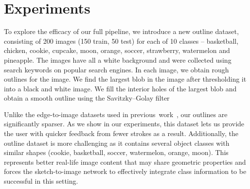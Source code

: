 
\section{Experiments}
\label{sec:experiments}
To explore the efficacy of our full pipeline, we introduce a new outline dataset, consisting of 200 images (150 train, 50 test) for each of 10 classes -- basketball, chicken, cookie, cupcake, moon, orange, soccer, strawberry,  watermelon and pineapple. The images have all a white background and were collected using search keywords on popular search engines.
In each image, we obtain rough outlines for the image. We find the largest blob in the image after thresholding it into a black and white image. We fill the interior holes of the largest blob and obtain a smooth outline using the Savitzky–Golay filter\cite{savitzky1964smoothing}

Unlike the edge-to-image datasets used in previous~work~\cite{isola2016image2image,zhu2017unpaired,wang2017high}, our outlines are significantly sparser. 
As we show in our experiments, this dataset lets us provide the user with quicker feedback from fewer strokes as a result. 
Additionally, the outline dataset is more challenging as it contains several object classes with similar shapes (cookie, basketball, soccer, watermelon, orange, moon). This represents better real-life image content that may share geometric properties and forces the sketch-to-image network to effectively integrate class information to be successful in this setting.

